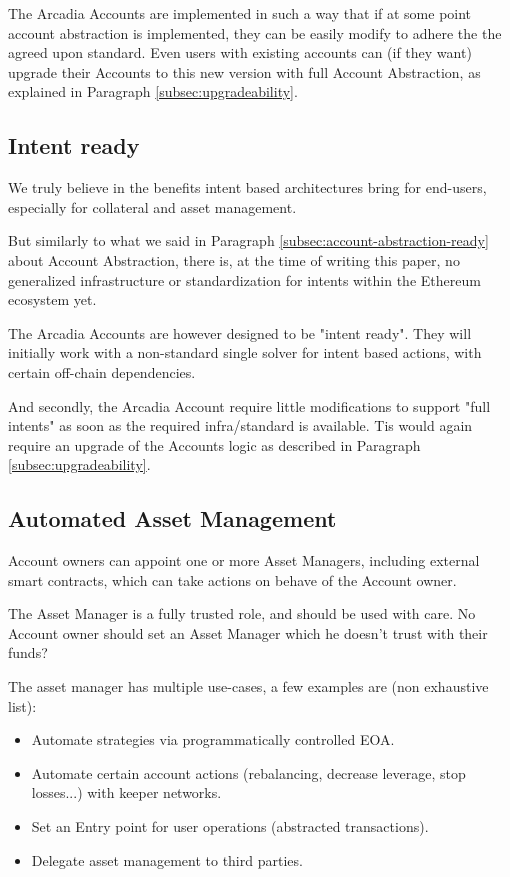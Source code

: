 \documentclass[sigconf,nonacm]{acmart}
\begin{document}
The Arcadia Accounts are implemented in such a way that if at some point account abstraction is implemented, they can be easily modify to adhere the the agreed upon standard.
Even users with existing accounts can (if they want) upgrade their Accounts to this new version with full Account Abstraction, as explained in Paragraph \ref{subsec:upgradeability}.

\subsection{Intent ready}
We truly believe in the benefits intent based architectures bring for end-users,
especially for collateral and asset management.

But similarly to what we said in Paragraph \ref{subsec:account-abstraction-ready} about Account Abstraction,
there is, at the time of writing this paper, no generalized infrastructure or standardization for intents within the Ethereum ecosystem yet.

The Arcadia Accounts are however designed to be "intent ready".
They will initially work with a non-standard single solver for intent based actions, with certain off-chain dependencies.

And secondly, the Arcadia Account require little modifications to support "full intents" as soon as the required infra/standard is available.
Tis would again require an upgrade of the Accounts logic as described in Paragraph \ref{subsec:upgradeability}.

\subsection{Automated Asset Management}
Account owners can appoint one or more Asset Managers, including external smart contracts, which can take actions on behave of the Account owner.

The Asset Manager is a fully trusted role, and should be used with care.
No Account owner should set an Asset Manager which he doesn’t trust with their funds?

The asset manager has multiple use-cases, a few examples are (non exhaustive list):
\begin{itemize}
    \item Automate strategies via programmatically controlled EOA.
    \item Automate certain account actions (rebalancing, decrease leverage, stop losses...) with keeper networks.
    \item Set an Entry point for user operations (abstracted transactions).
    \item Delegate asset management to third parties.
\end{itemize}
\end{document}
